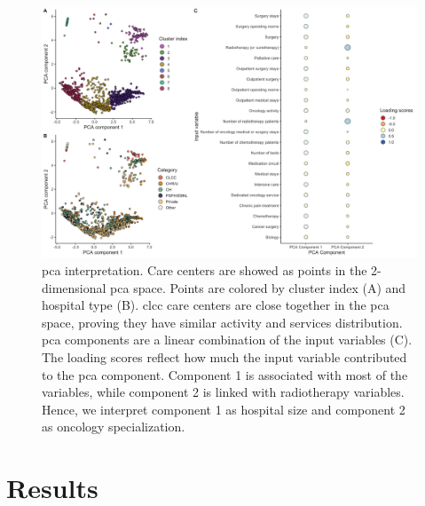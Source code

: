 \begin{figure}[H]
    \includegraphics[width=\textwidth]{images/camion/supplemental/sup_fig1_pca_and_clustering.png}
    \centering
    \caption{
        \ac{pca} interpretation. Care centers are showed as points in the 2-dimensional \ac{pca} space. Points are colored by cluster index (A) and hospital type (B). \ac{clcc} care centers are close together in the \acs{pca} space, proving they have similar activity and services distribution. \acs{pca} components are a linear combination of the input variables (C). The loading scores reflect how much the input variable contributed to the \acs{pca} component. Component 1 is associated with most of the variables, while component 2 is linked with radiotherapy variables. Hence, we interpret component 1 as hospital size and component 2 as oncology specialization.
    }
    \label{fig:clustering-pca}
\end{figure}

\section{Results}

